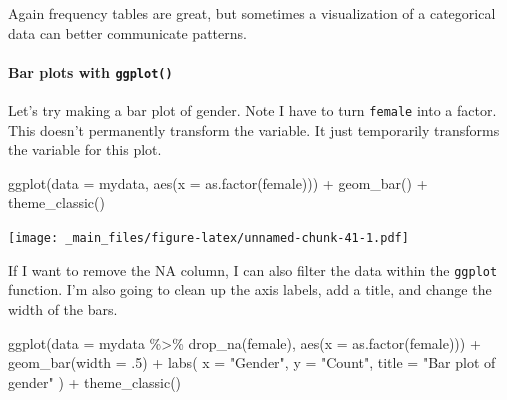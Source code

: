 \documentclass[
]{book}
\newenvironment{Shaded}{\begin{snugshade}}{\end{snugshade}}
\newcommand{\AttributeTok}[1]{\textcolor[rgb]{0.77,0.63,0.00}{#1}}
\newcommand{\DecValTok}[1]{\textcolor[rgb]{0.00,0.00,0.81}{#1}}
\newcommand{\FunctionTok}[1]{\textcolor[rgb]{0.00,0.00,0.00}{#1}}
\newcommand{\NormalTok}[1]{#1}
\newcommand{\SpecialCharTok}[1]{\textcolor[rgb]{0.00,0.00,0.00}{#1}}
\newcommand{\StringTok}[1]{\textcolor[rgb]{0.31,0.60,0.02}{#1}}
\begin{document}
Again frequency tables are great, but sometimes a visualization of a categorical data can better communicate patterns.

\hypertarget{barplot}{%
\paragraph*{\texorpdfstring{Bar plots with \texttt{ggplot()}}{Bar plots with ggplot()}}\label{barplot}}

Let's try making a bar plot of gender. Note I have to turn \texttt{female} into a factor. This doesn't permanently transform the variable. It just temporarily transforms the variable for this plot.

\begin{Shaded}
\begin{Highlighting}[]
\FunctionTok{ggplot}\NormalTok{(}\AttributeTok{data =}\NormalTok{ mydata, }\FunctionTok{aes}\NormalTok{(}\AttributeTok{x =} \FunctionTok{as.factor}\NormalTok{(female))) }\SpecialCharTok{+} 
  \FunctionTok{geom\_bar}\NormalTok{() }\SpecialCharTok{+} 
  \FunctionTok{theme\_classic}\NormalTok{()}
\end{Highlighting}
\end{Shaded}

\texttt{[image: \_main\_files/figure-latex/unnamed-chunk-41-1.pdf]}

If I want to remove the NA column, I can also filter the data within the \texttt{ggplot} function. I'm also going to clean up the axis labels, add a title, and change the width of the bars.

\begin{Shaded}
\begin{Highlighting}[]
\FunctionTok{ggplot}\NormalTok{(}\AttributeTok{data =}\NormalTok{ mydata }\SpecialCharTok{\%\textgreater{}\%} \FunctionTok{drop\_na}\NormalTok{(female), }\FunctionTok{aes}\NormalTok{(}\AttributeTok{x =} \FunctionTok{as.factor}\NormalTok{(female))) }\SpecialCharTok{+} 
  \FunctionTok{geom\_bar}\NormalTok{(}\AttributeTok{width =}\NormalTok{ .}\DecValTok{5}\NormalTok{) }\SpecialCharTok{+} 
  \FunctionTok{labs}\NormalTok{(}
    \AttributeTok{x =} \StringTok{"Gender"}\NormalTok{, }
    \AttributeTok{y =} \StringTok{"Count"}\NormalTok{, }
    \AttributeTok{title =} \StringTok{"Bar plot of gender"}
\NormalTok{  ) }\SpecialCharTok{+} 
  \FunctionTok{theme\_classic}\NormalTok{()}
\end{Highlighting}
\end{Shaded}
\end{document}
